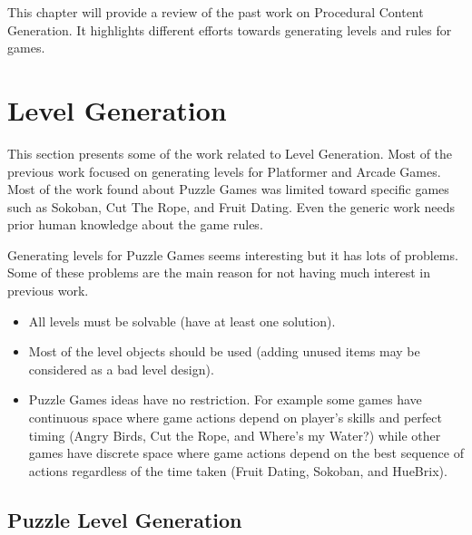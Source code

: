 This chapter will provide a review of the past work on Procedural Content Generation. It highlights different efforts towards generating levels and rules for games.

\section{Level Generation}
This section presents some of the work related to Level Generation. Most of the previous work focused on generating levels for Platformer and Arcade Games. Most of the work found about Puzzle Games was limited toward specific games such as Sokoban\cite{sokobanLevelGenerationNew, sokobanLevelGenerationOld}, Cut The Rope\cite{ctrSimulationApproach}, and Fruit Dating\cite{fruitDatingPCG}. Even the generic work needs prior human knowledge about the game rules\cite{ctrProgressiveApproach, ctrAutomaticGeneration}.\\\par

Generating levels for Puzzle Games seems interesting but it has lots of problems. Some of these problems are the main reason for not having much interest in previous work.
\begin{itemize} \itemsep0pt \parskip0pt 
	\item All levels must be solvable (have at least one solution).
	\item Most of the level objects should be used (adding unused items may be considered as a bad level design).
	\item Puzzle Games ideas have no restriction. For example some games have continuous space where game actions depend on player's skills and perfect timing (Angry Birds\cite{angryBirds}, Cut the Rope\cite{cutTheRope}, and Where's my Water?\cite{whereWater}) while other games have discrete space where game actions depend on the best sequence of actions regardless of the time taken (Fruit Dating\cite{fruitDating}, Sokoban\cite{sokoban}, and HueBrix\cite{hueBrix}).
\end{itemize}

\subsection{Puzzle Level Generation}

